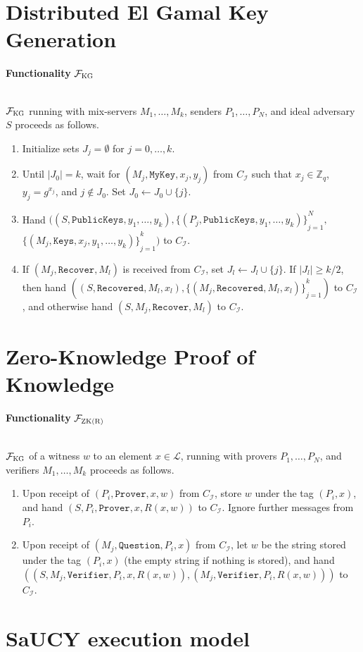 \documentclass[a4paper]{article}
\newcommand{\F}{\mathcal{F}}
\begin{document}
\section{Distributed El Gamal Key Generation~\cite{wikstrom2004universally}}

\begin{framed}
    \centerline{\textbf{Functionality} $\F_{\textsc{KG}}$}
    \ \\
    \noindent $\F_{\textsc{KG}}$ running with mix-servers $M_1, \ldots, M_k$, senders $P_1, \ldots, P_N$, and ideal adversary $S$ proceeds as follows.
    
    \begin{enumerate}
        \item Initialize sets $J_j = \emptyset$ for $j = 0, \ldots, k$.
        \item Until $|J_0| = k$, wait for $(M_j, \texttt{MyKey}, x_j, y_j)$ from $C_\mathcal{I}$ such that $x_j \in \mathbb{Z}_q$, $y_j = g^{x_j}$, and $j \not \in J_0$. Set $J_0 \leftarrow J_0 \cup \{j\}$.
        \item Hand $((S, \texttt{PublicKeys}, y_1, \ldots, y_k), {\{(P_j, \texttt{PublicKeys}, y_1, \ldots, y_k)\}}^{N}_{j=1},$ ${\{(M_j, \texttt{Keys}, x_j, y_1, \ldots, y_k)\}}^{k}_{j=1})$ to $C_\mathcal{I}$.
        \item If $(M_j, \texttt{Recover}, M_l)$ is received from $C_\mathcal{I}$, set $J_l \leftarrow J_l \cup \{j\}$. If $|J_l| \geq k/2$, then hand $((S, \texttt{Recovered}, M_l, x_l), {\{(M_j, \texttt{Recovered}, M_l, x_l)\}}^{k}_{j=1})$ to $C_\mathcal{I}$, and otherwise hand $(S, M_j, \texttt{Recover}, M_l)$ to $C_\mathcal{I}$.
    \end{enumerate}
\end{framed}

\section{Zero-Knowledge Proof of Knowledge~\cite{wikstrom2004universally}}

\begin{framed}
    \centerline{\textbf{Functionality} $\F_{\textsc{ZK(R)}}$}
    \ \\
    \noindent $\F_{\textsc{KG}}$ of a witness $w$ to an element $x \in \mathcal{L}$, running with provers $P_1, \ldots, P_N$, and verifiers $M_1, \ldots, M_k$ proceeds as follows.
    
    \begin{enumerate}
        \item Upon receipt of $(P_i, \texttt{Prover}, x, w)$ from $C_\mathcal{I}$, store $w$ under the tag $(P_i, x)$, and hand $(S, P_i, \texttt{Prover}, x, R(x, w))$ to $C_\mathcal{I}$. Ignore further messages from $P_i$.
        \item Upon receipt of $(M_j, \texttt{Question}, P_i, x)$ from $C_\mathcal{I}$, let $w$ be the string stored under the tag $(P_i, x)$ (the empty string if nothing is stored), and hand $((S, M_j, \texttt{Verifier}, P_i, x, R(x, w)), (M_j, \texttt{Verifier}, P_i, R(x, w)))$ to $C_\mathcal{I}$.
    \end{enumerate}
\end{framed}


\section{SaUCY execution model}




\end{document}
